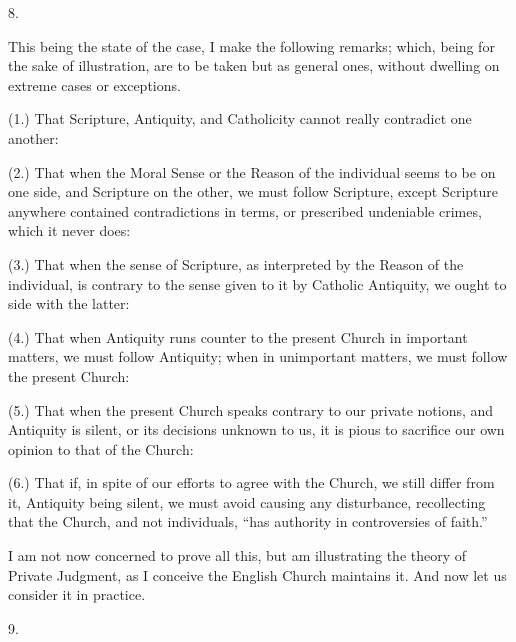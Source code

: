 8.

This being the state of the case, I make the following remarks;
which, being for the sake of illustration, are to be taken but as
general ones, without dwelling on extreme cases or exceptions.

(1.) That Scripture, Antiquity, and Catholicity cannot really
contradict one another:

(2.) That when the Moral Sense or the Reason of the individual
seems to be on one side, and Scripture on the other, we must follow
Scripture, except Scripture anywhere contained contradictions in
terms, or prescribed undeniable crimes, which it never does:

(3.) That when the sense of Scripture, as interpreted by the Reason
of the individual, is contrary to the sense given to it by Catholic
Antiquity, we ought to side with the latter:

(4.) That when Antiquity runs counter to the present Church in
important matters, we must follow Antiquity; when in unimportant
matters, we must follow the present Church:

(5.) That when the present Church speaks contrary to our private
notions, and Antiquity is silent, or its decisions unknown to us, it
is pious to sacrifice our own opinion to that of the Church:

(6.) That if, in spite of our efforts to agree with the Church, we
still differ from it, Antiquity being silent, we must avoid causing
any disturbance, recollecting that the Church, and not individuals,
``has authority in controversies of faith.''

I am not now concerned to prove all this, but am illustrating the
theory of Private Judgment, as I conceive the English Church maintains
it. And now let us consider it in practice.

9.

